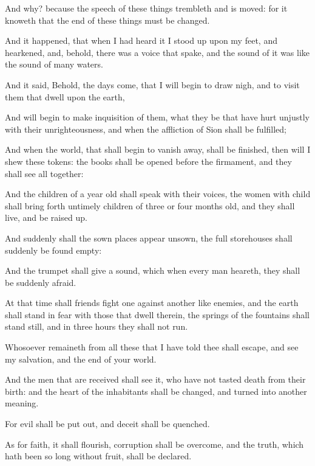 {\par }{\PP {}And why? because the speech of these things trembleth and is moved: for it knoweth that the end of these things must be changed.
\par }{\PP {}And it happened, that when I had heard it I stood up upon my feet, and hearkened, and, behold, there was a voice that spake, and the sound of it was like the sound of many waters.
\par }{\PP {}And it said, Behold, the days come, that I will begin to draw nigh, and to visit them that dwell upon the earth,
\par }{\PP {}And will begin to make inquisition of them, what they be that have hurt unjustly with their unrighteousness, and when the affliction of Sion shall be fulfilled;
\par }{\PP {}And when the world, that shall begin to vanish away, shall be finished, then will I shew these tokens: the books shall be opened before the firmament, and they shall see all together:
\par }{\PP {}And the children of a year old shall speak with their voices, the women with child shall bring forth untimely children of three or four months old, and they shall live, and be raised up.
\par }{\PP {}And suddenly shall the sown places appear unsown, the full storehouses shall suddenly be found empty:
\par }{\PP {}And the trumpet shall give a sound, which when every man heareth, they shall be suddenly afraid.
\par }{\PP {}At that time shall friends fight one against another like enemies, and the earth shall stand in fear with those that dwell therein, the springs of the fountains shall stand still, and in three hours they shall not run.
\par }{\PP {}Whosoever remaineth from all these that I have told thee shall escape, and see my salvation, and the end of your world.
\par }{\PP {}And the men that are received shall see it, who have not tasted death from their birth: and the heart of the inhabitants shall be changed, and turned into another meaning.
\par }{\PP {}For evil shall be put out, and deceit shall be quenched.
\par }{\PP {}As for faith, it shall flourish, corruption shall be overcome, and the truth, which hath been so long without fruit, shall be declared.
}
